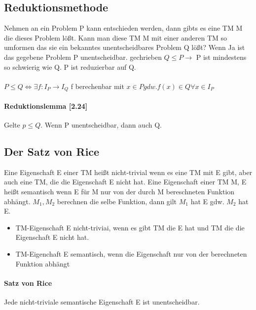 \documentclass[a4paper, 10pt]{article}
\theoremstyle{definition}
\begin{document}
\subsection{Reduktionsmethode}
Nehmen an ein Problem P kann entschieden werden, dann gibts es eine TM M die dieses Problem lößt. Kann man diese TM M mit einer anderen TM so umformen das sie ein bekanntes unentscheidbares Problem Q lößt? Wenn Ja ist das gegebene Problem P unentscheidbar. gechrieben $Q\leq P \to$ P ist mindestens so schwierig wie Q. P ist reduzierbar auf Q.\\ \\ 
$P\leq Q \Longleftrightarrow \exists f:I_P\to I_Q$ f berechenbar mit $x\in P gdw. f(x)\in Q\forall x\in I_P$
\paragraph{Reduktionslemma [2.24]} Gelte $p\leq Q$. Wenn P unentscheidbar, dann auch Q.
\subsection{Der Satz von Rice}
Eine Eigenschaft E einer TM heißt nicht-trivial wenn es eine TM mit E gibt, aber auch eine TM, die die Eigenschaft E nicht hat. Eine Eigenschaft einer TM M,  E heißt semantisch wenn E für M nur von der durch M bereschneten Funktion abhängt. $M_1,M_2$ berechnen die selbe Funktion, dann gilt $M_1$ hat E gdw. $M_2$ hat E.
\begin{itemize}
    \item TM-Eigenschaft E nicht-triviai, wenn es gibt TM die E hat und TM die die Eigenschaft E nicht hat.
    \item TM-Eigenchaft E semantisch, wenn die Eigenschaft nur von der berechneten Funktion abhängt\begin{itemize}
        \item $M_1\land M_2$ berechnen die selbe Funktion $\Longrightarrow M_1$ hat E gdw. $M_2}$ hat E
    \end{itemize}
\end{itemize}
\paragraph{Satz von Rice} Jede nicht-triviale semantische Eigenschaft E ist unentscheidbar. 
\end{document}
